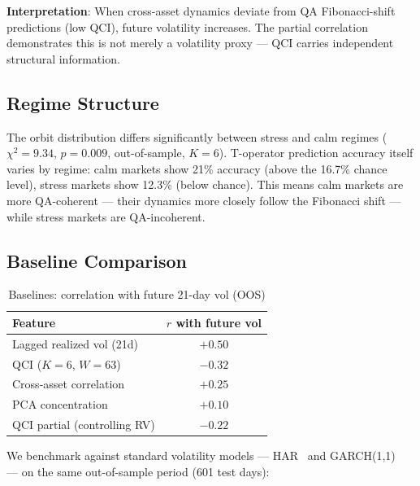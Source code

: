 \documentclass[11pt,a4paper]{article}
\begin{document}
\textbf{Interpretation}: When cross-asset dynamics deviate from QA
Fibonacci-shift predictions (low QCI), future volatility increases.
The partial correlation demonstrates this is not merely a volatility
proxy --- QCI carries independent structural information.

\subsection{Regime Structure}

The orbit distribution differs significantly between stress and calm regimes
($\chi^2 = 9.34$, $p = 0.009$, out-of-sample, $K=6$).
T-operator prediction accuracy itself varies by regime:
calm markets show 21\% accuracy (above the 16.7\% chance level),
stress markets show 12.3\% (below chance).
This means calm markets are more QA-coherent --- their dynamics more closely
follow the Fibonacci shift --- while stress markets are QA-incoherent.

\subsection{Baseline Comparison}

\begin{table}[h]
\centering
\caption{Baselines: correlation with future 21-day vol (OOS)}
\begin{tabular}{lc}
\toprule
Feature & $r$ with future vol \\
\midrule
Lagged realized vol (21d) & $+0.50$ \\
QCI ($K=6$, $W=63$) & $-0.32$ \\
Cross-asset correlation & $+0.25$ \\
PCA concentration & $+0.10$ \\
\midrule
QCI partial (controlling RV) & $-0.22$ \\
\bottomrule
\end{tabular}
\end{table}

We benchmark against standard volatility models --- HAR~\cite{corsi2009}
and GARCH(1,1)~\cite{bollerslev1986} --- on the same out-of-sample period
(601 test days):
\end{document}
